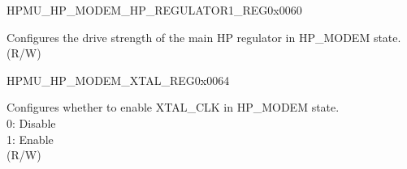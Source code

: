 \begin{register}{H}{PMU\_HP\_MODEM\_HP\_REGULATOR1\_REG}{0x0060}\label{regdesc:PMUHPMODEMHPREGULATOR1REG}
%
%
\regnewline%
\begin{regdesc}\begin{reglist}
\label{fielddesc:PMUHPMODEMHPREGULATORDRVB}\item [PMU\_HP\_MODEM\_HP\_REGULATOR\_DRV\_B] Configures the drive strength of the main HP regulator in HP\_MODEM state. (R/W)
\end{reglist}\end{regdesc}
\end{register}


\begin{register}{H}{PMU\_HP\_MODEM\_XTAL\_REG}{0x0064}\label{regdesc:PMUHPMODEMXTALREG}
%
%
\regnewline%
\begin{regdesc}\begin{reglist}
\label{fielddesc:PMUHPMODEMXPDXTAL}\item [PMU\_HP\_MODEM\_XPD\_XTAL] Configures whether to enable XTAL\_CLK in HP\_MODEM state.\\
0: Disable\\
1: Enable\\
(R/W)
\end{reglist}\end{regdesc}
\end{register}


